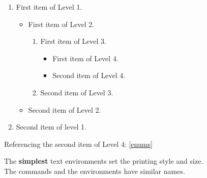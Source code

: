 \documentclass{amsart}
\begin{document}
\medskip
\begin{enumerate}
    \item First item of Level 1.
        \begin{itemize}
            \item First item of Level 2.
                \begin{enumerate}
                    \item First item of Level 3.
                        \begin{itemize}
                            \item First item of Level 4.
                            \item Second item of Level 4.\label{enums}
                        \end{itemize}
                    \item Second item of Level 3.
                \end{enumerate}
            \item Second item of Level 2.
        \end{itemize}
    \item Second item of level 1.
\end{enumerate}
Referencing the second item of Level 4: \ref{enums}

\begin{flushright}
    The {\bfseries simplest}
    text environments set the
    printing style and size.\\
    The commands and the environments have similar names.
\end{flushright}
\end{document}
